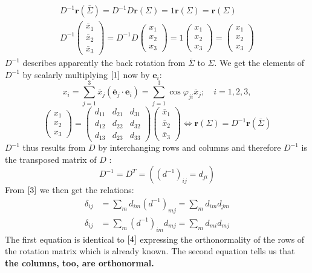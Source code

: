 \documentclass[12pt]{book}
\theoremstyle{definition}\newtheorem{dfn}{Définition}[chapter]
\theoremstyle{plain}\newtheorem{thm}{Théorème}[chapter]
\theoremstyle{plain}\newtheorem{prp}{Proposition}[chapter]
\theoremstyle{plain}\newtheorem{lem}{\bf Lemme}[chapter]
\theoremstyle{plain}\newtheorem{axm}{\bf Axiome}[chapter]
\theoremstyle{plain}\newtheorem{lmm}{\bf Lemme}[chapter]
\theoremstyle{plain}\newtheorem{cor}{\bf Corollaire}[chapter]
\theoremstyle{remark}\newtheorem{rem}{Remarque}[chapter]
\begin{document}
$$
\begin{array}{c}
D^{-1} \mathbf{r}(\bar{\Sigma})=D^{-1} D \mathbf{r}(\Sigma)=\mathfrak{1} \mathbf{r}(\Sigma)=\mathbf{r}(\Sigma) \\
D^{-1}\left(\begin{array}{l}
\bar{x}_{1} \\
\bar{x}_{2} \\
\bar{x}_{3}
\end{array}\right)=D^{-1} D\left(\begin{array}{l}
x_{1} \\
x_{2} \\
x_{3}
\end{array}\right)=\mathfrak{1}\left(\begin{array}{l}
x_{1} \\
x_{2} \\
x_{3}
\end{array}\right)=\left(\begin{array}{l}
x_{1} \\
x_{2} \\
x_{3}
\end{array}\right)
\end{array}
$$
$D^{-1}$ describes apparently the back rotation from $\bar{\Sigma}$ to $\Sigma .$ We get the elements of $D^{-1}$ by scalarly multiplying $\ref{1}$ now by $\mathbf{e}_{i}:$
$$
x_{i}=\sum_{j=1}^{3} \bar{x}_{j}\left(\overline{\mathbf{e}}_{j} \cdot \mathbf{e}_{i}\right)=\sum_{j=1}^{3} \cos \varphi_{j i} \bar{x}_{j} ; \quad i=1,2,3,
$$
$$
\left(\begin{array}{l}
x_{1} \\
x_{2} \\
x_{3}
\end{array}\right)=\left(\begin{array}{lll}
d_{11} & d_{21} & d_{31} \\
d_{12} & d_{22} & d_{32} \\
d_{13} & d_{23} & d_{33}
\end{array}\right)\left(\begin{array}{l}
\bar{x}_{1} \\
\bar{x}_{2} \\
\bar{x}_{3}
\end{array}\right) \Longleftrightarrow \mathbf{r}(\Sigma)=D^{-1} \mathbf{r}(\bar{\Sigma})
$$
$D^{-1}$ thus results from $D$ by interchanging rows and columns and therefore $D^{-1}$ is the transposed matrix of $D$ :
$$
D^{-1}=D^{T}=\left(\left(d^{-1}\right)_{i j}=d_{j i}\right)
$$
From $\ref{3}$ we then get the relations:
$$
\begin{aligned}
\delta_{i j} &=\sum_{m} d_{i m}\left(d^{-1}\right)_{m j}=\sum_{m} d_{i m} d_{j m} \\
\delta_{i j} &=\sum_{m}\left(d^{-1}\right)_{i m} d_{m j}=\sum_{m} d_{m i} d_{m j}
\end{aligned}
$$
The first equation is identical to $\ref{4}$ expressing the orthonormality of the rows
of the rotation matrix which is already known. The second equation tells us that {\bf the
columns, too, are orthonormal.}
\end{document}
